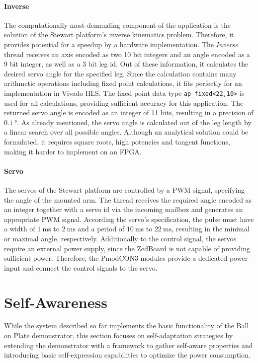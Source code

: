 \paragraph{Inverse} The computationally most demanding component of the
application is the solution of the Stewart platform's inverse kinematics
problem. Therefore, it provides potential for a speedup by a hardware
implementation. The \emph{Inverse} thread receives an axis encoded as two 10
bit integers and an angle encoded as a 9 bit integer, as well as a 3 bit leg
id. Out of these information, it calculates the desired servo angle for the
specified leg. Since the calculation contains many arithmetic operations
including fixed point calculations, it fits perfectly for an implementation in
Vivado HLS. The fixed point data type \lstinline{ap_fixed<22,10>} is used for
all calculations, providing sufficient accuracy for this application. The
returned servo angle is encoded as an integer of 11 bits, resulting in a
precision of $\SI{0.1}{\degree}$. As already mentioned, the servo angle is
calculated out of the leg length by a linear search over all possible angles.
Although an analytical solution could be formulated, it requires square roots,
high potencies and tangent functions, making it harder to implement on an
FPGA.

\paragraph{Servo} The servos of the Stewart platform are controlled by a
\ac{PWM} signal, specifying the angle of the mounted arm. The thread receives
the required angle encoded as an integer together with a servo id via the
incoming mailbox and generates an appropriate \ac{PWM} signal. According the
servo's specification, the pulse must have a width of $\SI{1}{\milli\second}$
to $\SI{2}{\milli\second}$ and a period of $\SI{10}{\milli\second}$ to
$\SI{22}{\milli\second}$, resulting in the minimal or maximal angle,
respectively. Additionally to the control signal, the servos require an
external power supply, since the ZedBoard is not capable of providing
sufficient power. Therefore, the PmodCON3 modules provide a dedicated power
input and connect the control signals to the servo.

\section{Self-Awareness}
While the system described so far implements the basic functionality of the
Ball on Plate demonstrator, this section focuses on self-adaptation strategies
by extending the demonstrator with a framework to gather self-aware properties
and introducing basic self-expression capabilities to optimize the power
consumption.


